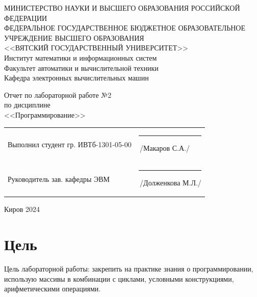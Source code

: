 \documentclass[a4paper,14pt]{extarticle}
\begin{document}
	
	\newpage\thispagestyle{empty}
	\begin{center}
		\MakeUppercase{
			Министерство науки и высшего образования Российской Федерации\\
			Федеральное государственное бюджетное образовательное учреждение высшего образования\\
			<<Вятский Государственный Университет>>\\
		}
		Институт математики и информационных систем\\
		Факультет автоматики и вычислительной техники\\
		Кафедра электронных вычислительных машин
	\end{center}
	\vfill
	
	\begin{center}
		Отчет по лабораторной работе №2\\
		по дисциплине\\
		<<Программирование>>\\
	\end{center}
	\vfill
	
	\noindent
	\begin{tabular}{ll}
		Выполнил студент гр. ИВТб-1301-05-00 \hspace{5mm} &
		\rule[-1mm]{25mm}{0.10mm}\,/Макаров С.А./\\
		
		Руководитель зав. кафедры ЭВМ & \rule[-1mm]{25mm}{0.10mm}\,/Долженкова М.Л./\\
	\end{tabular}
	
	\vfill
	\begin{center}
		Киров 2024
	\end{center}
	
	\newpage
	\section*{Цель}
	Цель лабораторной работы: закрепить на практике знания о программировании, использую массивы в комбинации с циклами, условными конструкциями, арифметическими операциями.
	
\end{document}
